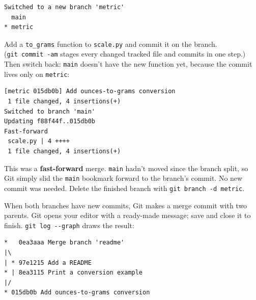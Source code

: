 \begin{codeblock}
\begin{Verbatim}[formatcom=\outputstyle]
Switched to a new branch 'metric'
  main
* metric
\end{Verbatim}
\end{codeblock}

Add a \texttt{to\_grams} function to \texttt{scale.py} and commit it on the branch. (\texttt{git\ commit\ -am} stages every changed tracked file and commits in one step.) Then switch back: \texttt{main} doesn't have the new function yet, because the commit lives only on \texttt{metric}:

\begin{codeblock}

\begin{Shaded}
\begin{Highlighting}[]
 
\end{Highlighting}
\end{Shaded}

\end{codeblock}

\begin{codeblock}
\begin{Verbatim}[formatcom=\outputstyle]
[metric 015db0b] Add ounces-to-grams conversion
 1 file changed, 4 insertions(+)
Switched to branch 'main'
Updating f88f44f..015db0b
Fast-forward
 scale.py | 4 ++++
 1 file changed, 4 insertions(+)
\end{Verbatim}
\end{codeblock}

This was a \textbf{fast-forward} merge. \texttt{main} hadn't moved since the branch split, so Git simply slid the \texttt{main} bookmark forward to the branch's commit. No new commit was needed. Delete the finished branch with \texttt{git\ branch\ -d\ metric}.


When both branches have new commits, Git makes a merge commit with two parents. Git opens your editor with a ready-made message; save and close it to finish. \texttt{git\ log\ -\/-graph} draws the result:

\begin{codeblock}
\begin{Verbatim}[formatcom=\outputstyle]
*   0ea3aaa Merge branch 'readme'
|\  
| * 97e1215 Add a README
* | 8ea3115 Print a conversion example
|/  
* 015db0b Add ounces-to-grams conversion
\end{Verbatim}
\end{codeblock}

